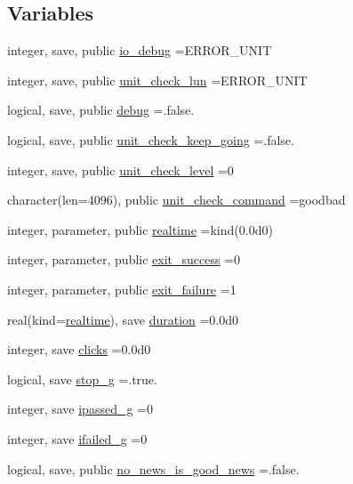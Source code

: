 \subsection*{Variables}
\begin{DoxyCompactItemize}
\item 
integer, save, public \mbox{\hyperlink{namespacem__verify_a7014b3aa584eb29266bf52fc6e03e6ed}{io\+\_\+debug}} =E\+R\+R\+O\+R\+\_\+\+U\+N\+IT
\item 
integer, save, public \mbox{\hyperlink{namespacem__verify_a65569c8b4be204251ba14430ad18372d}{unit\+\_\+check\+\_\+lun}} =E\+R\+R\+O\+R\+\_\+\+U\+N\+IT
\item 
logical, save, public \mbox{\hyperlink{namespacem__verify_a0f87b43bebf70897f9ec711be3f01839}{debug}} =.false.
\item 
logical, save, public \mbox{\hyperlink{namespacem__verify_a434af7c4d380da5b85d49dc07466dde8}{unit\+\_\+check\+\_\+keep\+\_\+going}} =.false.
\item 
integer, save, public \mbox{\hyperlink{namespacem__verify_afe37222ddb2a9470e1a0e9c40e2dcce3}{unit\+\_\+check\+\_\+level}} =0
\item 
character(len=4096), public \mbox{\hyperlink{namespacem__verify_aaa3c6dfa94a9414592071525036020d4}{unit\+\_\+check\+\_\+command}} =\textquotesingle{}goodbad\textquotesingle{}
\item 
integer, parameter, public \mbox{\hyperlink{namespacem__verify_a7f6aa94b09b3824bc5c15bc74e757d6b}{realtime}} =kind(0.\+0d0)
\item 
integer, parameter, public \mbox{\hyperlink{namespacem__verify_a278d7a36f55fac875e4f94bc893447fe}{exit\+\_\+success}} =0
\item 
integer, parameter, public \mbox{\hyperlink{namespacem__verify_a458c47b6b47738f8ebadddb4a944d0e0}{exit\+\_\+failure}} =1
\item 
real(kind=\mbox{\hyperlink{namespacem__verify_a7f6aa94b09b3824bc5c15bc74e757d6b}{realtime}}), save \mbox{\hyperlink{namespacem__verify_a77729c599fbd8aed6075a05fb3c38146}{duration}} =0.\+0d0
\item 
integer, save \mbox{\hyperlink{namespacem__verify_af97c7f92394811bec5fed506fdfab67d}{clicks}} =0.\+0d0
\item 
logical, save \mbox{\hyperlink{namespacem__verify_a425cad68370e8552495e1838b2e34734}{stop\+\_\+g}} =.true.
\item 
integer, save \mbox{\hyperlink{namespacem__verify_ada62999b3a1ef795c335deccac28cda5}{ipassed\+\_\+g}} =0
\item 
integer, save \mbox{\hyperlink{namespacem__verify_ab18f1875be62b6aa1e101894358b617f}{ifailed\+\_\+g}} =0
\item 
logical, save, public \mbox{\hyperlink{namespacem__verify_aa827fd6225334c65efe89d1d0af79efa}{no\+\_\+news\+\_\+is\+\_\+good\+\_\+news}} =.false.
\end{DoxyCompactItemize}


